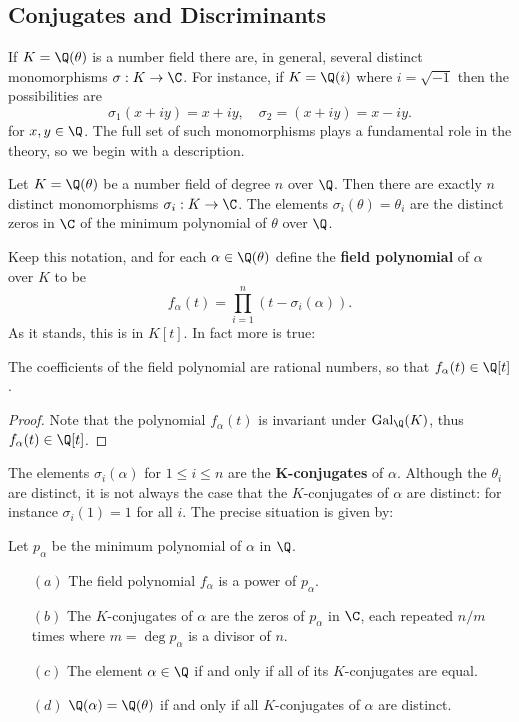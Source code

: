 \subsection{Conjugates and Discriminants}
If $K=\Q(\theta)$ is a number field there are, in general, several distinct monomorphisms $\sigma:K\to\C$. For instance, if $K=\Q(i)$ where $i=\sqrt{-1}$ then the possibilities are
\[\sigma_1(x+iy)=x+iy,\quad\sigma_2=(x+iy)=x-iy.\]
for $x,y\in\Q$. The full set of such monomorphisms plays a fundamental role in the theory, so we begin with a description.
\begin{theorem}
Let $K=\Q(\theta)$ be a number field of degree $n$ over $\Q$. Then there are exactly $n$ distinct monomorphisms $\sigma_i:K\to\C$. The elements $\sigma_i(\theta)=\theta_i$ are the distinct zeros in $\C$ of the minimum polynomial of $\theta$ over $\Q$.
\end{theorem}
Keep this notation, and for each $\alpha\in\Q(\theta)$ define the \textbf{field polynomial} of $\alpha$ over $K$ to be
\[f_\alpha(t)=\prod_{i=1}^{n}(t-\sigma_i(\alpha)).\]
As it stands, this is in $K[t]$. In fact more is true:
\begin{theorem}
The coefficients of the field polynomial are rational numbers, so that $f_\alpha(t)\in\Q[t]$.
\end{theorem}
\begin{proof}
Note that the polynomial $f_\alpha(t)$ is invariant under $\mathrm{Gal}_\Q(K)$, thus $f_\alpha(t)\in\Q[t]$.
\end{proof}
The elements $\sigma_i(\alpha)$ for $1\leq i\leq n$ are the \textbf{$\bm{K}$-conjugates} of $\alpha$. Although the $\theta_i$ are distinct, it is not always the case that the $K$-conjugates of $\alpha$ are distinct: for instance $\sigma_i(1)=1$ for all $i$. The precise situation is given by:
\begin{proposition}\label{field polonomial}
Let $p_\alpha$ be the minimum polynomial of $\alpha$ in $\Q$.
\begin{itemize}
\item[$(a)$] The field polynomial $f_\alpha$ is a power of $p_\alpha$.
\item[$(b)$] The $K$-conjugates of $\alpha$ are the zeros of $p_\alpha$ in $\C$, each repeated $n/m$ times where $m=\deg p_\alpha$ is a divisor of $n$.
\item[$(c)$] The element $\alpha\in\Q$ if and only if all of its $K$-conjugates are equal.
\item[$(d)$] $\Q(\alpha)=\Q(\theta)$ if and only if all $K$-conjugates of $\alpha$ are distinct.
\end{itemize}
\end{proposition}
